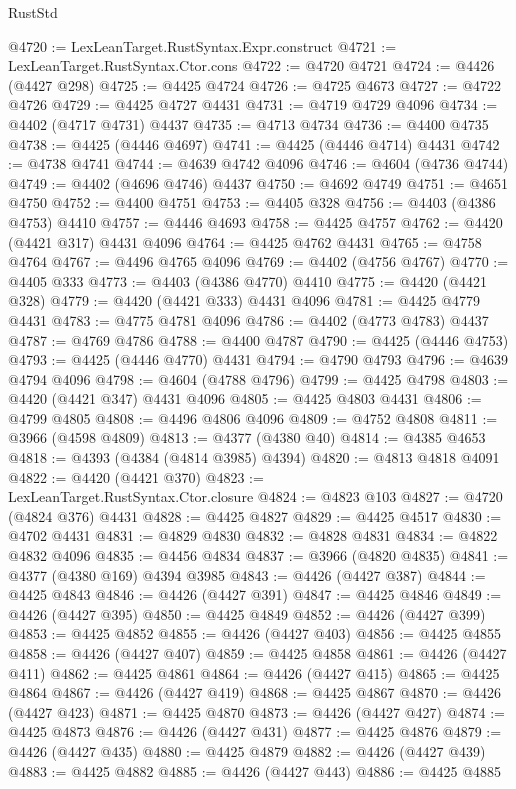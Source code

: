 \begin{lexlean}{RustStd}
\begin{coremodule}
@4720 := LexLeanTarget.RustSyntax.Expr.construct
@4721 := LexLeanTarget.RustSyntax.Ctor.cons
@4722 := @4720 @4721
@4724 := @4426 (@4427 @298)
@4725 := @4425 @4724
@4726 := @4725 @4673
@4727 := @4722 @4726
@4729 := @4425 @4727 @4431
@4731 := @4719 @4729 @4096
@4734 := @4402 (@4717 @4731) @4437
@4735 := @4713 @4734
@4736 := @4400 @4735
@4738 := @4425 (@4446 @4697)
@4741 := @4425 (@4446 @4714) @4431
@4742 := @4738 @4741
@4744 := @4639 @4742 @4096
@4746 := @4604 (@4736 @4744)
@4749 := @4402 (@4696 @4746) @4437
@4750 := @4692 @4749
@4751 := @4651 @4750
@4752 := @4400 @4751
@4753 := @4405 @328
@4756 := @4403 (@4386 @4753) @4410
@4757 := @4446 @4693
@4758 := @4425 @4757
@4762 := @4420 (@4421 @317) @4431 @4096
@4764 := @4425 @4762 @4431
@4765 := @4758 @4764
@4767 := @4496 @4765 @4096
@4769 := @4402 (@4756 @4767)
@4770 := @4405 @333
@4773 := @4403 (@4386 @4770) @4410
@4775 := @4420 (@4421 @328)
@4779 := @4420 (@4421 @333) @4431 @4096
@4781 := @4425 @4779 @4431
@4783 := @4775 @4781 @4096
@4786 := @4402 (@4773 @4783) @4437
@4787 := @4769 @4786
@4788 := @4400 @4787
@4790 := @4425 (@4446 @4753)
@4793 := @4425 (@4446 @4770) @4431
@4794 := @4790 @4793
@4796 := @4639 @4794 @4096
@4798 := @4604 (@4788 @4796)
@4799 := @4425 @4798
@4803 := @4420 (@4421 @347) @4431 @4096
@4805 := @4425 @4803 @4431
@4806 := @4799 @4805
@4808 := @4496 @4806 @4096
@4809 := @4752 @4808
@4811 := @3966 (@4598 @4809)
@4813 := @4377 (@4380 @40)
@4814 := @4385 @4653
@4818 := @4393 (@4384 (@4814 @3985) @4394)
@4820 := @4813 @4818 @4091
@4822 := @4420 (@4421 @370)
@4823 := LexLeanTarget.RustSyntax.Ctor.closure
@4824 := @4823 @103
@4827 := @4720 (@4824 @376) @4431
@4828 := @4425 @4827
@4829 := @4425 @4517
@4830 := @4702 @4431
@4831 := @4829 @4830
@4832 := @4828 @4831
@4834 := @4822 @4832 @4096
@4835 := @4456 @4834
@4837 := @3966 (@4820 @4835)
@4841 := @4377 (@4380 @169) @4394 @3985
@4843 := @4426 (@4427 @387)
@4844 := @4425 @4843
@4846 := @4426 (@4427 @391)
@4847 := @4425 @4846
@4849 := @4426 (@4427 @395)
@4850 := @4425 @4849
@4852 := @4426 (@4427 @399)
@4853 := @4425 @4852
@4855 := @4426 (@4427 @403)
@4856 := @4425 @4855
@4858 := @4426 (@4427 @407)
@4859 := @4425 @4858
@4861 := @4426 (@4427 @411)
@4862 := @4425 @4861
@4864 := @4426 (@4427 @415)
@4865 := @4425 @4864
@4867 := @4426 (@4427 @419)
@4868 := @4425 @4867
@4870 := @4426 (@4427 @423)
@4871 := @4425 @4870
@4873 := @4426 (@4427 @427)
@4874 := @4425 @4873
@4876 := @4426 (@4427 @431)
@4877 := @4425 @4876
@4879 := @4426 (@4427 @435)
@4880 := @4425 @4879
@4882 := @4426 (@4427 @439)
@4883 := @4425 @4882
@4885 := @4426 (@4427 @443)
@4886 := @4425 @4885

\end{coremodule}
\end{lexlean}
